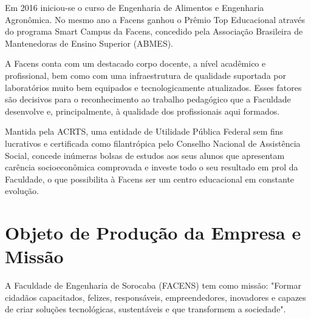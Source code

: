 \documentclass[
	12pt,				%
	oneside,			%
	a4paper,			%
	chapter=TITLE,		%
	section=TITLE,		%
	sumario=tradicional %
	english,			%
	french,				%
	spanish,			%
	brazil				%
	]{abntex2}
\begin{document}
Em 2016 iniciou-se o curso de Engenharia de Alimentos e Engenharia Agronômica. No mesmo ano a Facens ganhou o Prêmio Top Educacional através do programa Smart Campus da Facens, concedido pela Associação Brasileira de Mantenedoras de Ensino Superior (ABMES).

A Facens conta com um destacado corpo docente, a nível acadêmico e profissional, bem como com uma infraestrutura de qualidade suportada por laboratórios muito bem equipados e tecnologicamente atualizados. Esses fatores são decisivos para o reconhecimento ao trabalho pedagógico que a Faculdade desenvolve e, principalmente, à qualidade dos profissionais aqui formados.

Mantida pela ACRTS, uma entidade de Utilidade Pública Federal sem fins lucrativos e certificada como filantrópica pelo Conselho Nacional de Assistência Social, concede inúmeras bolsas de estudos aos seus alunos que apresentam carência socioeconômica comprovada e investe todo o seu resultado em prol da Faculdade, o que possibilita à Facens ser um centro educacional em constante evolução.

\section{Objeto de Produção da Empresa e Missão}
\label{sec:prodmissaoempresa}
A Faculdade de Engenharia de Sorocaba (FACENS) tem como missão: "Formar cidadãos capacitados, felizes, responsáveis, empreendedores, inovadores e capazes de criar soluções tecnológicas, sustentáveis e que transformem a sociedade".
\end{document}
